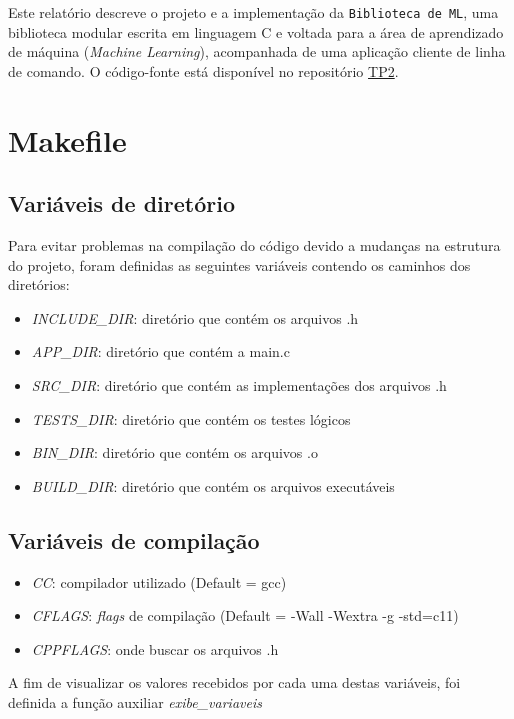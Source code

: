 \documentclass[12pt,a4paper]{article}
\newcommand{\biblioteca}{\texttt{{Biblioteca de ML}}\xspace}
\begin{document}
Este relatório descreve o projeto e a implementação da \biblioteca, uma
biblioteca modular escrita em linguagem C e voltada para a área de aprendizado
de máquina (\emph{Machine Learning}), acompanhada de uma aplicação cliente de
linha de comando. O código-fonte está disponível no repositório
\href{https://github.com/Jaime-Cg-si/MAC0216-TP2-Bibliotecas-Make.git}{TP2}.

\section{Makefile}\label{sec:makefile}

\subsection{Variáveis de diretório}\label{subsec:makefile_var_dir}
Para evitar problemas na compilação do código devido a mudanças na estrutura do projeto, 
foram definidas as seguintes variáveis contendo os caminhos dos diretórios:

\begin{itemize}
  \item \emph{INCLUDE\_DIR}:    diretório que contém os arquivos .h
  \item \emph{APP\_DIR}:        diretório que contém a main.c
  \item \emph{SRC\_DIR}:        diretório que contém as implementações dos arquivos .h 
  \item \emph{TESTS\_DIR}:      diretório que contém os testes lógicos
  \item \emph{BIN\_DIR}:        diretório que contém os arquivos .o
  \item \emph{BUILD\_DIR}:      diretório que contém os arquivos executáveis
\end{itemize}



\subsection{Variáveis de compilação}\label{subsec:makefile_var_comp}
\begin{itemize}
  \item \emph{CC}:        compilador utilizado (Default = gcc)
  \item \emph{CFLAGS}:    \emph{flags} de compilação (Default = -Wall -Wextra -g -std=c11)
  \item \emph{CPPFLAGS}:  onde buscar os arquivos .h 
\end{itemize}
A fim de visualizar os valores recebidos por cada uma destas variáveis, foi definida a função
auxiliar \emph{exibe\_variaveis}
\end{document}

